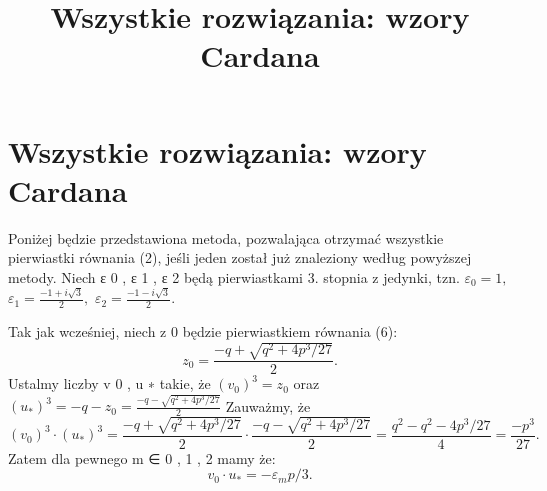 \documentclass{article}
\begin{document}
\title{Wszystkie rozwiązania: wzory Cardana}
\maketitle

\section{Wszystkie rozwiązania: wzory Cardana}
Poniżej będzie przedstawiona metoda, pozwalająca otrzymać wszystkie pierwiastki równania (2), jeśli jeden został już znaleziony według powyższej metody. Niech ε 0 , ε 1 , ε 2  będą pierwiastkami 3. stopnia z jedynki, tzn. 
$\varepsilon_0=1,$ $\varepsilon_1=\frac{-1 + i\sqrt 3}{2},$ $\varepsilon_2= \frac{-1 - i\sqrt 3}{2}.$

Tak jak wcześniej, niech z 0 będzie pierwiastkiem równania (6): 
$$z_0=\frac{-q+\sqrt{q^2+4p^3/27}}{2}.$$
Ustalmy liczby v 0 , u ∗ takie, że 
$(v_0)^3=z_0$ oraz $(u_*)^3=-q-z_0=\frac{-q-\sqrt{q^2+4p^3/27}}{2}$
Zauważmy, że 
$$(v_0)^3\cdot (u_*)^3=\frac{-q+\sqrt{q^2+4p^3/27}}{2}\cdot \frac{-q-\sqrt{q^2+4p^3/27}}{2}=\frac{q^2-q^2-4p^3/27}{4}=\frac{-p^3}{27}.$$
Zatem dla pewnego m ∈ { 0 , 1 , 2 }mamy że:
$$v_0\cdot u_*=-\varepsilon_m p/3.$$
\end{document}
